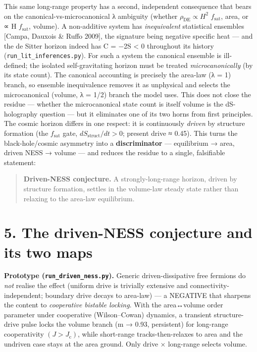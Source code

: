 \documentclass[
  10pt,
]{article}
\begin{document}
This same long-range property has a second, independent consequence that
bears on the canonical-vs-microcanonical λ ambiguity (whether
\(\rho _{\mathrm{DE}} \propto  H^{2}\) \(f_{\mathrm{sat}}\), area, or ∝
H \(f_{\mathrm{sat}}\), volume). A non-additive system has
\emph{inequivalent} statistical ensembles {[}Campa, Dauxois \& Ruffo
2009{]}, the signature being negative specific heat --- and the de
Sitter horizon indeed has C = −2S \textless{} 0 throughout its history
(\texttt{run\_lit\_inferences.py}). For such a system the canonical
ensemble is ill-defined; the isolated self-gravitating horizon must be
treated \emph{microcanonically} (by its state count). The canonical
accounting is precisely the area-law (λ = 1) branch, so ensemble
inequivalence removes it as unphysical and selects the microcanonical
(volume, λ = 1/2) branch the model uses. This does not close the residue
--- whether the microcanonical state count is itself volume is the
dS-holography question --- but it eliminates one of its two horns from
first principles. The cosmic horizon differs in one respect: it is
continuously \emph{driven} by structure formation (the
\(f_{\mathrm{sat}}\) gate, \(dS_{\mathrm{struct}}/dt > 0\); present
drive ≈ 0.45). This turns the black-hole/cosmic asymmetry into a
\textbf{discriminator} --- equilibrium → area, driven NESS → volume ---
and reduces the residue to a single, falsifiable statement:

\begin{quote}
\textbf{Driven-NESS conjecture.} A strongly-long-range horizon, driven
by structure formation, settles in the volume-law steady state rather
than relaxing to the area-law equilibrium.
\end{quote}

\section{5. The driven-NESS conjecture and its two
maps}\label{the-driven-ness-conjecture-and-its-two-maps}

\textbf{Prototype (\texttt{run\_driven\_ness.py}).} Generic
driven-dissipative free fermions do \emph{not} realise the effect
(uniform drive is trivially extensive and connectivity-independent;
boundary drive decays to area-law) --- a NEGATIVE that sharpens the
content to \emph{cooperative bistable locking}. With the area↔volume
order parameter under cooperative (Wilson--Cowan) dynamics, a transient
structure-drive pulse locks the volume branch (m → 0.93, persistent) for
long-range cooperativity \((J > J_{\mathrm{c}})\), while short-range
tracks-then-relaxes to area and the undriven case stays at the area
ground. Only drive × long-range selects volume.
\end{document}
